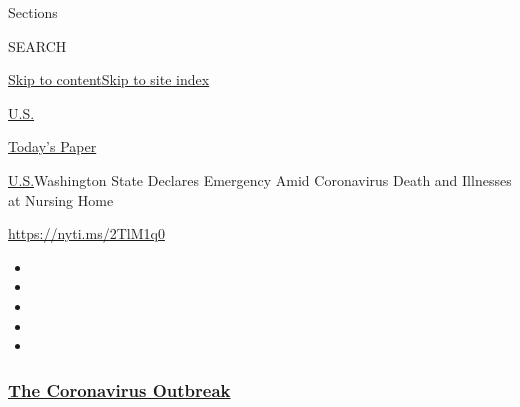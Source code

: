 Sections

SEARCH

\protect\hyperlink{site-content}{Skip to
content}\protect\hyperlink{site-index}{Skip to site index}

\href{https://www.nytimes3xbfgragh.onion/section/us}{U.S.}

\href{https://myaccount.nytimes3xbfgragh.onion/auth/login?response_type=cookie\&client_id=vi}{}

\href{https://www.nytimes3xbfgragh.onion/section/todayspaper}{Today's
Paper}

\href{/section/us}{U.S.}\textbar{}Washington State Declares Emergency
Amid Coronavirus Death and Illnesses at Nursing Home

\url{https://nyti.ms/2TlM1q0}

\begin{itemize}
\item
\item
\item
\item
\item
\end{itemize}

\hypertarget{the-coronavirus-outbreak}{%
\subsubsection{\texorpdfstring{\href{https://www.nytimes3xbfgragh.onion/news-event/coronavirus?name=styln-coronavirus-national\&region=TOP_BANNER\&variant=undefined\&block=storyline_menu_recirc\&action=click\&pgtype=Article\&impression_id=12f52010-e398-11ea-950f-95281846e31d}{The
Coronavirus
Outbreak}}{The Coronavirus Outbreak}}\label{the-coronavirus-outbreak}}


